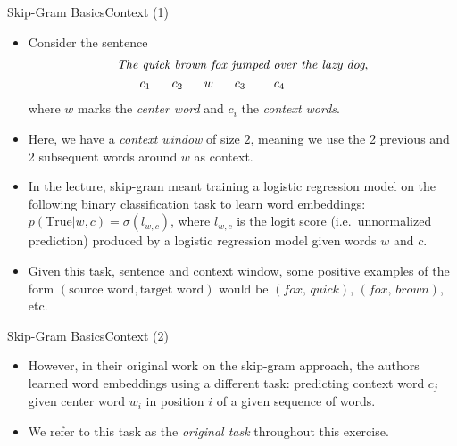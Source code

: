 \documentclass[t]{beamer}
\begin{document}
\begin{frame}{Skip-Gram Basics}{Context (1)}
    \begin{itemize}
        \item Consider the sentence
              \begin{align*}
                  \textit{The quick brown fox jumped over the lazy dog}, \\
                  c_1 \hspace{0.60cm}
                  c_2 \hspace{0.60cm}
                  w \hspace{0.60cm}
                  c_3 \hspace{0.80cm}
                  c_4 \hspace{2.35cm}
              \end{align*}
              where $w$ marks the \emph{center word} and $c_i$ the
              \emph{context words}.
        \item Here, we have a \emph{context window} of size $2$, meaning we use
              the 2 previous and 2 subsequent words around $w$ as context.
        \item In the lecture, skip-gram meant training a logistic regression
              model on the following binary classification task to learn word
              embeddings: $p(\text{True}|w,c) = \sigma{(l_{w,c})}$, where
              $l_{w,c}$ is the logit score (i.e.\ unnormalized prediction)
              produced by a logistic regression model given words $w$ and $c$.
        \item Given this task, sentence and context window, some positive
              examples of the form $(\text{source word}, \text{target word})$
              would be $(\textit{fox, quick})$, $(\textit{fox, brown})$, etc.
    \end{itemize}
\end{frame}

\begin{frame}{Skip-Gram Basics}{Context (2)}
    \begin{itemize}
        \item However, in their original work on the skip-gram approach, the
              authors learned word embeddings using a different task: predicting
              context word $c_j$ given center word $w_i$ in position $i$ of a
              given sequence of words.
        \item We refer to this task as the \emph{original task} throughout this
              exercise.
    \end{itemize}
\end{frame}
\end{document}
